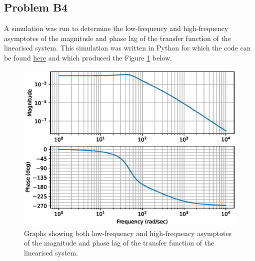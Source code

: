 \subsection*{Problem B4}
    \hfill \break
    A simulation was run to determine the low-frequency and high-frequency asymptotes of the magnitude and phase lag of the transfer function of the linearised system. This simulation was written in Python for which the code can be found \href{https://github.com/drlim2u/ELE2024-Control-Coursework/blob/059953dc7b2d8ba0a86b6f437153ceb4442b7a60/PartB.py#L125}{here} and which produced the Figure \ref{fig:problem_b4} below.
    \begin{figure}[H]
        \centering
        \includegraphics[width=0.6\linewidth]{figures/problem_b4.eps}
        \caption{Graphs showing both low-frequency and high-frequency asymptotes of the magnitude and phase lag of the transfer function of the linearised system.}
        \label{fig:problem_b4}
    \end{figure}